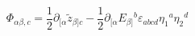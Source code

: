 \begin{equation}
[\delta_1, \delta_2] \Phi_{\alpha\beta,c} = \frac{1}{2}
\partial_{[\alpha} \tilde{z}_{\beta]c} - \frac{1}{2}
\partial_{[\alpha} E_{\beta]}{}^b \varepsilon_{abcd} \eta_1{}^a
\eta_2{}^d
\end{equation}

